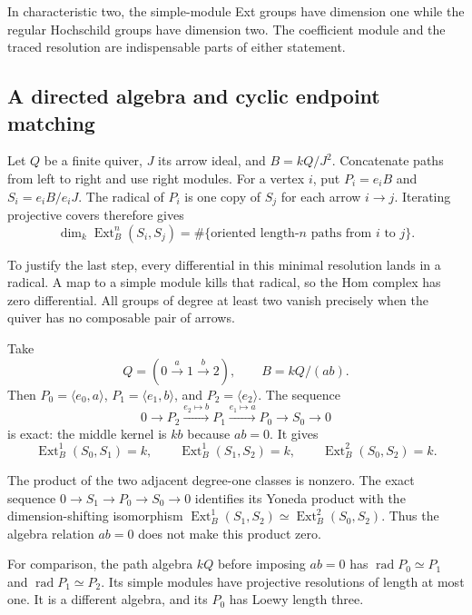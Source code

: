 In characteristic two, the simple-module Ext groups have dimension one while
the regular Hochschild groups have dimension two. The coefficient module and
the traced resolution are indispensable parts of either statement.

\subsection{A directed algebra and cyclic endpoint matching}

Let $Q$ be a finite quiver, $J$ its arrow ideal, and $B=kQ/J^2$. Concatenate
paths from left to right and use right modules. For a vertex $i$, put
$P_i=e_iB$ and $S_i=e_iB/e_iJ$. The radical of $P_i$ is one copy of $S_j$
for each arrow $i\to j$. Iterating projective covers therefore gives
\begin{equation}
\label{v4-arith:traces:path-ext}
 \dim_k\operatorname{Ext}^n_B(S_i,S_j)
  =\#\{\text{oriented length-}n\text{ paths from }i\text{ to }j\}.
\end{equation}

To justify the last step, every differential in this minimal resolution
lands in a radical. A map to a simple module kills that radical, so the Hom
complex has zero differential. All groups of degree at least two vanish
precisely when the quiver has no composable pair of arrows.

Take
\[
 Q=(0\xrightarrow{a}1\xrightarrow{b}2),\qquad B=kQ/(ab).
\]
Then $P_0=\langle e_0,a\rangle$, $P_1=\langle e_1,b\rangle$, and
$P_2=\langle e_2\rangle$. The sequence
\[
 0\longrightarrow P_2\xrightarrow{e_2\mapsto b}P_1
 \xrightarrow{e_1\mapsto a}P_0\longrightarrow S_0
 \longrightarrow0
\]
is exact: the middle kernel is $kb$ because $ab=0$. It gives
\[
 \operatorname{Ext}^1_B(S_0,S_1)=k,\qquad
 \operatorname{Ext}^1_B(S_1,S_2)=k,\qquad
 \operatorname{Ext}^2_B(S_0,S_2)=k.
\]

The product of the two adjacent degree-one classes is nonzero. The exact
sequence $0\to S_1\to P_0\to S_0\to0$ identifies its Yoneda product with the
dimension-shifting isomorphism $\operatorname{Ext}^1_B(S_1,S_2)\simeq
\operatorname{Ext}^2_B(S_0,S_2)$. Thus the algebra relation $ab=0$ does not
make this product zero.

For comparison, the path algebra $kQ$ before imposing $ab=0$ has
$\operatorname{rad}P_0\simeq P_1$ and $\operatorname{rad}P_1\simeq P_2$. Its
simple modules have projective resolutions of length at most one. It is a
different algebra, and its $P_0$ has Loewy length three.


